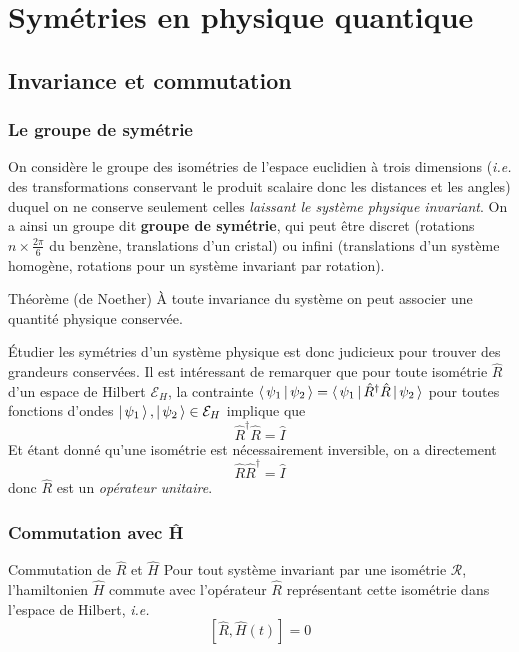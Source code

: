 \section{Symétries en physique quantique}

    \subsection{Invariance et commutation}

        \subsubsection{Le groupe de symétrie}

    On considère le groupe des isométries de l’espace euclidien à trois dimensions (\textit{i.e.} des transformations conservant le produit scalaire donc les distances et les angles) duquel on ne conserve seulement celles \textit{laissant le système physique invariant}. On a ainsi un groupe dit \textbf{groupe de symétrie}, qui peut être discret (rotations $n \times \frac{2\pi}{6}$ du benzène, translations d’un cristal) ou infini (translations d’un système homogène, rotations pour un système invariant par rotation).

    \begin{omed}{Théorème (de Noether)}
        À toute invariance du système on peut associer une quantité physique conservée.
    \end{omed}

    Étudier les symétries d’un système physique est donc judicieux pour trouver des grandeurs conservées. Il est intéressant de remarquer que pour toute isométrie $\hat{R}$ d’un espace de Hilbert $\mathcal{E}_H$, la contrainte $\left< \, \psi_1 \, \middle| \, \psi_2 \, \right> = \left< \, \psi_1 \, \right| \hat{R}^{\dagger} \hat{R} \left| \, \psi_2 \, \right>$ pour toutes fonctions d’ondes $\left| \, \psi_1 \, \right>, \left| \, \psi_2 \, \right> \in \mathcal{E}_H$ implique que 
    \[  \hat{R}^{\dagger} \hat{R} = \hat{I} \]
    Et étant donné qu’une isométrie est nécessairement inversible, on a directement 
    \[  \hat{R} \hat{R}^{\dagger} = \hat{I} \]
    donc $\hat{R}$ est un \textit{opérateur unitaire}.

        \subsubsection{Commutation avec Ĥ}

    \begin{omed}{Commutation de $\hat{R}$ et $\hat{H}$}
        Pour tout système invariant par une isométrie $\mathcal{R}$, l’hamiltonien $\hat{H}$ commute avec l’opérateur $\hat{R}$ représentant cette isométrie dans l’espace de Hilbert, \textit{i.e.}
        \[ \left[\hat{R}, \hat{H}(t)\right] = 0 \]
    \end{omed}

